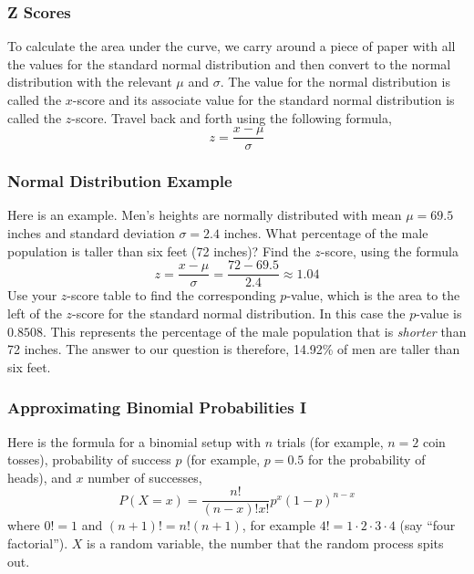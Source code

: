 \documentclass[xcolor=dvipsnames]{beamer}
\begin{document}
\begin{frame}
  \frametitle{Z Scores}
To calculate the area under the curve, we carry around a piece of
paper with all the values for the \alert{standard normal distribution}
and then convert to the normal distribution with the relevant $\mu$
and $\sigma$. The value for the normal distribution is called the
\alert{$x$-score} and its associate value for the standard normal distribution
is called the \alert{$z$-score}. Travel back and forth using the following
formula,
\begin{equation}
  \label{eq:uotoogoo}
  z=\frac{x-\mu}{\sigma}
\end{equation}
\end{frame}

\begin{frame}
  \frametitle{Normal Distribution Example}
Here is an example. Men's heights are normally distributed with mean
$\mu=69.5$ inches and standard deviation $\sigma=2.4$ inches. What
percentage of the male population is taller than six feet (72 inches)?
Find the $z$-score, using the formula
\begin{equation}
  \label{eq:igutheib}
  z=\frac{x-\mu}{\sigma}=\frac{72-69.5}{2.4}\approx{}1.04
\end{equation}
Use your $z$-score table to find the corresponding \alert{$p$-value},
which is the area to the left of the $z$-score for the standard normal
distribution. In this case the $p$-value is $0.8508$. This represents
the percentage of the male population that is \emph{shorter} than 72
inches. The answer to our question is therefore, 14.92\% of men are
taller than six feet.
\end{frame}

\begin{frame}
  \frametitle{Approximating Binomial Probabilities I}
Here is the formula for a \alert{binomial} setup with $n$ trials (for example,
$n=2$ coin tosses), probability of success $p$ (for example, $p=0.5$ for the
probability of heads), and $x$ number of successes,
\begin{equation}
  \label{eq:iedohdah}
  P(X=x)=\frac{n!}{(n-x)!x!}p^{x}(1-p)^{n-x}
\end{equation}
where $0!=1$ and $(n+1)!=n!(n+1)$, for example
$4!=1\cdot{}2\cdot{}3\cdot{}4$ (say ``four factorial''). $X$ is a
\alert{random variable}, the number that the random process spits out.
\end{frame}
\end{document}
